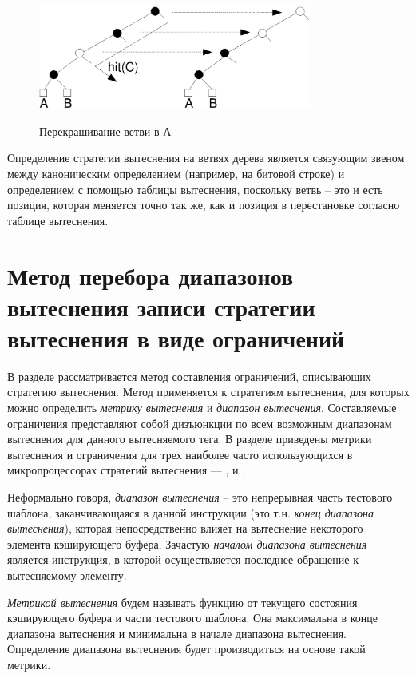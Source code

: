\begin{figure}[h] \center
  \includegraphics[width=0.8\textwidth]{1.review/recolor}\\
  \caption{Перекрашивание ветви в А}\label{recolor}
\end{figure}


Определение стратегии вытеснения \PseudoLRU на ветвях дерева
является связующим звеном между каноническим определением (например,
на битовой строке) и определением с помощью таблицы вытеснения,
поскольку ветвь -- это и есть позиция, которая меняется точно так
же, как и позиция в перестановке согласно таблице вытеснения.


\section{Метод перебора диапазонов вытеснения записи стратегии
вытеснения в виде ограничений}

В разделе рассматривается метод составления ограничений, описывающих
стратегию вытеснения. Метод применяется к стратегиям вытеснения, для
которых можно определить \emph{метрику вытеснения} и \emph{диапазон
вытеснения}. Составляемые ограничения представляют собой дизъюнкции
по всем возможным диапазонам вытеснения для данного вытесняемого
тега. В разделе приведены метрики вытеснения и ограничения для трех
наиболее часто использующихся в микропроцессорах стратегий
вытеснения --- \LRU, \FIFO и \PseudoLRU.

Неформально говоря, \emph{диапазон вытеснения} -- это непрерывная
часть тестового шаблона, заканчивающаяся в данной инструкции (это
т.н. \emph{конец диапазона вытеснения}), которая непосредственно
влияет на вытеснение некоторого элемента кэширующего буфера.
Зачастую \emph{началом диапазона вытеснения} является инструкция, в
которой осуществляется последнее обращение к вытесняемому элементу.

\emph{Метрикой вытеснения} будем называть функцию от текущего
состояния кэширующего буфера и части тестового шаблона. Она
максимальна в конце диапазона вытеснения и минимальна в начале
диапазона вытеснения. Определение диапазона вытеснения будет
производиться на основе такой метрики.

